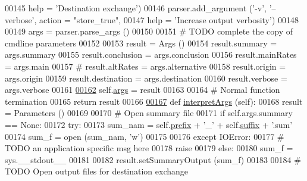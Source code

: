 \begin{DoxyCode}
{00145                              help = \textcolor{stringliteral}{'Destination exchange'})
00146         parser.add\_argument (\textcolor{stringliteral}{'-v'}, \textcolor{stringliteral}{'--verbose'}, action = \textcolor{stringliteral}{"store\_true"},
00147                              help = \textcolor{stringliteral}{'Increase output verbosity'})
00148                              
00149         args = parser.parse\_args ()
00150         
00151         \textcolor{comment}{# TODO complete the copy of cmdline parameters}
00152         
00153         result = Args ()
00154         result.summary     = args.summary 
00155         result.conclusion  = args.conclusion 
00156         result.mainRates   = args.main 
00157 \textcolor{comment}{#        result.altRates    = args.alternative }
00158         result.origin      = args.origin 
00159         result.destination = args.destination 
00160         result.verbose     = args.verbose
00161         
\hypertarget{e2e_8py_source.tex_l00162}{}\hyperlink{classe2e_1_1_application_abade6fc2e2c04ddd7e48137a2a7721bd}{00162}         self.\hyperlink{classe2e_1_1_application_abade6fc2e2c04ddd7e48137a2a7721bd}{args} = result
00163         
00164         \textcolor{comment}{# Normal function termination}
00165         \textcolor{keywordflow}{return} result
00166         
\hypertarget{e2e_8py_source.tex_l00167}{}\hyperlink{classe2e_1_1_application_ae7b9559aa388f8178300fb4d7a9f9257}{00167}     \textcolor{keyword}{def }\hyperlink{classe2e_1_1_application_ae7b9559aa388f8178300fb4d7a9f9257}{interpretArgs} (self):
00168         result = Parameters ()
00169         
00170         \textcolor{comment}{# Open summary file}
00171         \textcolor{keywordflow}{if} self.args.summary == \textcolor{keywordtype}{None}:
00172             \textcolor{keywordflow}{try}:
00173                 sum\_nam =  self.\hyperlink{classe2e_1_1_application_a027ff25e5409ae17584978a09fc2611a}{prefix} + \textcolor{stringliteral}{'\_'} + self.\hyperlink{classe2e_1_1_application_a4d824ad36b051d2d629edb314385df0d}{suffix} + \textcolor{stringliteral}{'.sum'}
00174                 sum\_f = open (sum\_nam, \textcolor{stringliteral}{'w'})
00175                 
00176             \textcolor{keywordflow}{except} IOError:
00177                 \textcolor{comment}{# TODO an application specific msg here}
00178                 \textcolor{keywordflow}{raise}
00179         \textcolor{keywordflow}{else}:
00180             sum\_f = sys.\_\_stdout\_\_
00181             
00182         result.setSummaryOutput (sum\_f)
00183             
00184         \textcolor{comment}{# TODO Open output files for destination exchange}
}
\end{DoxyCode}
